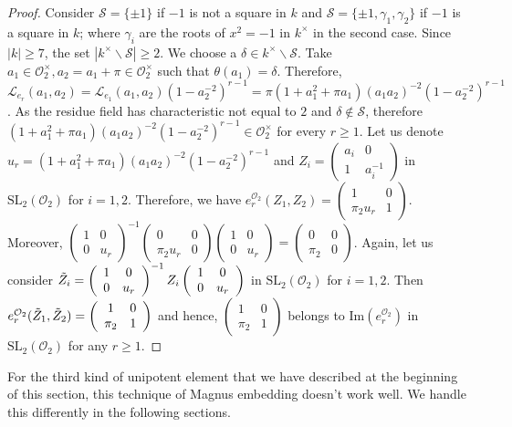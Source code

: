 \documentclass[10pt,twoside]{amsart}
\newcommand{\SL}{\mathrm{SL}}
\newcommand{\im}{\mathrm{Im}}
\newcommand{\R}{\mathcal{O}_2}
\theoremstyle{definition}
\theoremstyle{definition}
\begin{document}
\begin{proof}
Consider $\mathcal{S} = \{\pm 1\}$ if $-1$ is not a square in $k$ and $\mathcal{S} = \{\pm1, \gamma_1, \gamma_2\}$ if $-1$ is a square in $k$; where $\gamma_i$ are the roots of $x^2 = -1$ in $k^{\times}$ in the second case. Since $|k|\geq 7$, the set $|k^{\times}\backslash\mathcal{S}| \geq 2$. We choose a $\delta \in k^{\times} \backslash \mathcal{S}$. Take $a_1\in \R^{\times}, a_2 = a_1 + \pi\in \R^{\times}$ such that $\theta(a_1) = \delta$. Therefore, $\mathcal{L}_{e_r}(a_1, a_2) = \mathcal{L}_{e_1}(a_1, a_2)(1 - a_2^{-2})^{r-1} = \pi(1 + a_1^2 + \pi a_1)(a_1a_2)^{-2} (1 - a_2^{-2})^{r-1}$. As the residue field has characteristic not equal to $2$ and $\delta \notin \mathcal{S}$, therefore $(1 + a_1^2+\pi a_1)(a_1a_2)^{-2}(1 - a_2^{-2})^{r-1}\in \R^{\times}$ for every $r\geq 1$. Let us denote $u_r = (1+a_1^2+\pi a_1)(a_1a_2)^{-2}(1-a_2^{-2})^{r-1}$ and $Z_i=\left(\begin{array}{cc} a_i  & 0 \\ 1  & a_i^{-1}
\end{array}\right)$ in $\SL_2(\R)$ for $i=1, 2$. Therefore, we have $e_r^{\R}(Z_1, Z_2) = \left(\begin{array}{cc} 1  & 0 \\  \pi_2 u_r  & 1 \end{array}\right)$. Moreover, $\left( \begin{array}{cc} 1  & 0 \\ 0 & u_r \end{array} \right)^{-1} \left( \begin{array}{cc} 0  & 0 \\ \pi_2 u_r & 0 \end{array} \right) \left( \begin{array}{cc} 1  & 0 \\ 0 & u_r \end{array} \right) = \left(\begin{array}{cc} 0  & 0 \\ \pi_2 & 0
\end{array} \right)$. Again, let us consider $\Tilde{Z}_i = \left(\begin{array}{cc} 1  & 0 \\ 0 & u_r \end{array} \right)^{-1} Z_i \left(\begin{array}{cc} 1  & 0 \\ 0 & u_r
\end{array} \right)$ in $\SL_2(\R)$ for $i=1, 2$. Then $e_r^{\R}(\Tilde{Z}_1, \Tilde{Z}_2) = \left(\begin{array}{cc} 1  & 0 \\
   \pi_2 & 1 \end{array} \right)$ and hence, $\left(\begin{array}{cc} 1  & 0 \\ \pi_2 & 1
\end{array}\right)$ belongs to $\im(e_r^{\R})$ in $\SL_2(\R)$ for any $r\geq 1$.
\end{proof} 
For the third kind of unipotent element that we have described at the beginning of this section, this technique of Magnus embedding doesn't work well. We handle this differently in the following sections.
\end{document}
